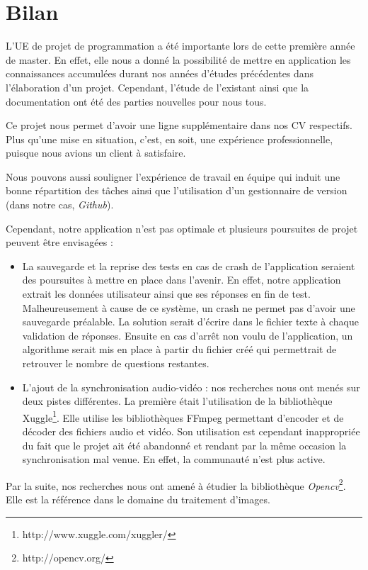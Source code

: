 \chapter{Bilan}


L'UE de projet de programmation a été importante lors de cette première année de master. En effet, elle nous a donné la possibilité de mettre en application les connaissances accumulées durant nos années d'études précédentes dans l'élaboration d'un projet. Cependant, l'étude de l'existant ainsi que la documentation ont été des parties nouvelles pour nous tous.

Ce projet nous permet d'avoir une ligne supplémentaire dans nos CV respectifs. Plus qu'une mise en situation, c'est, en soit, une expérience professionnelle, puisque nous avions un client à satisfaire.

Nous pouvons aussi souligner l'expérience de travail en équipe qui induit une bonne répartition des tâches ainsi que l'utilisation d'un gestionnaire de version (dans notre cas, \textit{Github}).

Cependant, notre application n'est pas optimale et plusieurs poursuites de projet peuvent être envisagées :

\begin{itemize}
 \item La sauvegarde et la reprise des tests en cas de crash de l'application seraient des poursuites à mettre en place dans l'avenir. En effet, notre application extrait les données utilisateur ainsi que ses réponses en fin de test. Malheureusement à cause de ce système, un crash ne permet pas d'avoir une sauvegarde préalable. La solution serait d'écrire dans le fichier texte à chaque validation de réponses. Ensuite en cas d'arrêt non voulu de l'application, un algorithme serait mis en place à partir du fichier créé qui permettrait de retrouver le nombre de questions restantes.
 \item L'ajout de la synchronisation audio-vidéo : nos recherches nous ont menés sur deux pistes différentes. La première était l'utilisation de la bibliothèque Xuggle\footnote{http://www.xuggle.com/xuggler/}. Elle utilise les bibliothèques FFmpeg permettant d'encoder et de décoder des fichiers audio et vidéo.
Son utilisation est cependant inappropriée du fait que le projet ait été abandonné et rendant par la même occasion la synchronisation mal venue. En effet, la communauté n'est plus active.
\end{itemize}

Par la suite, nos recherches nous ont amené à étudier la bibliothèque \textit{Opencv}\footnote{http://opencv.org/}. Elle est la référence dans le domaine du traitement d'images.

